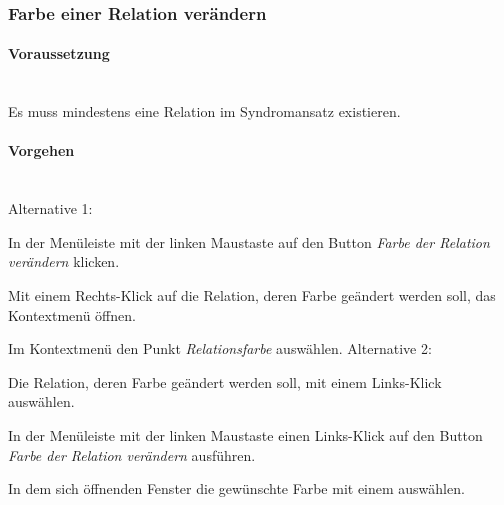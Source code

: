 \documentclass[enabledeprecatedfontcommands,fontsize=11pt,paper=a4,twoside]{scrartcl}
\newcommand*{\condition}{\paragraph{Voraussetzung}$\;$ \vspace{0.2cm}\\}
\newcommand*{\actions}{\paragraph{Vorgehen} $\;$\vspace{0.2cm}\\}
\newcommand*{\aOne}{\textcolor{bbe}{Alternative 1:}}
\newcommand*{\aTwo}{\textcolor{bbe}{Alternative 2:}}
\let\origenumerate\enumerate
\let\origendenumerate\endenumerate
\renewenvironment{enumerate}{\origenumerate \addtolength{\itemsep}{-10.0pt}}{\origendenumerate}
\begin{document}
\subsubsection{Farbe einer Relation verändern}
		\condition
		Es muss mindestens eine Relation im Syndromansatz existieren.
		\actions
		\aOne
		\begin{enumerate}
			\item In der Menüleiste mit der linken Maustaste auf den Button \textit{Farbe der Relation verändern} klicken.
			\item Mit einem Rechts-Klick auf die Relation, deren Farbe geändert werden soll, das Kontextmenü öffnen.
			\item Im Kontextmenü den Punkt \textit{Relationsfarbe} auswählen.
		\end{enumerate}
		\aTwo
		\begin{enumerate}
			\item Die Relation, deren Farbe geändert werden soll, mit einem Links-Klick auswählen.
			\item In der Menüleiste mit der linken Maustaste einen Links-Klick auf den Button \textit{Farbe der Relation verändern} ausführen.
			\item In dem sich öffnenden Fenster die gewünschte Farbe mit einem auswählen. \\
		\end{enumerate}	
		
\newpage
\end{document}
